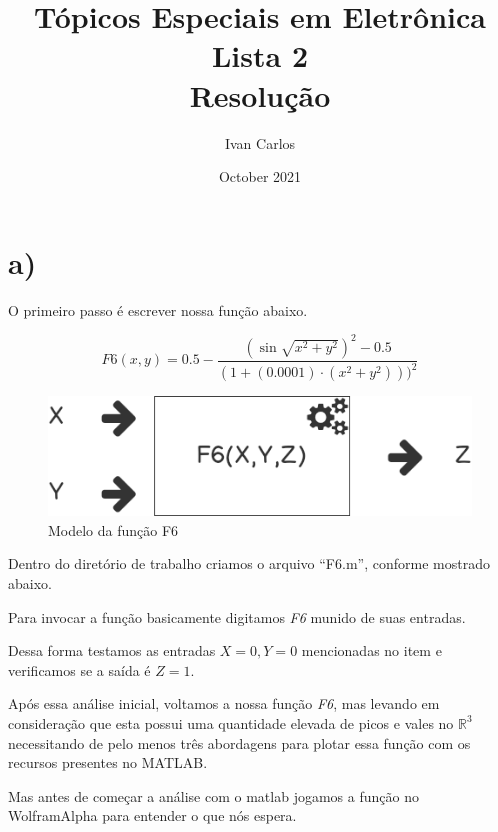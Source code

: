 \documentclass{article}
\title{%
  Tópicos Especiais em Eletrônica\\
  \large Lista 2\\
    Resolução}
\author{Ivan Carlos}
\date{October 2021}
\begin{document}
\maketitle

\section{a)}

O primeiro passo é escrever nossa função abaixo.

\begin{equation} \label{eq1}
    F6(x,y) = 0.5-\frac{(\sin\sqrt{x^2+y^2})^2 -0.5}{(1+(0.0001)\cdot (x^2+y^2)))^2}
\end{equation}

\begin{figure}[h!]
\centering
\includegraphics[scale=.3]{images/fun.png}
\caption{Modelo da função F6}
\label{fig:func_f6_model}
\end{figure}

\begin{flushleft}
Dentro do diretório de trabalho criamos o arquivo ``F6.m'',
conforme mostrado abaixo.
\end{flushleft}


\begin{flushleft}
Para invocar a função basicamente digitamos \emph{F6} munido de
suas entradas.

Dessa forma testamos as entradas $X=0, Y=0$ mencionadas no item
e verificamos se a saída é $Z=1$.
\end{flushleft}



\begin{flushleft}
Após essa análise inicial, voltamos a nossa função \emph{F6},
mas levando em consideração que esta possui uma quantidade
elevada de picos e vales no $\mathbb{R}^3$ necessitando de pelo
menos três abordagens para plotar essa função com os recursos
presentes no MATLAB\cite{MATLAB:2020b}.

%

Mas antes de começar a análise com o matlab jogamos a função no
WolframAlpha\cite{WolframAlpha} para entender o que nós espera.
\end{flushleft}
\end{document}

